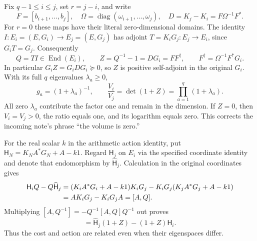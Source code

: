 \documentclass[11pt]{article}
\begin{document}
Fix $q-1\le i\le j$, set $r=j-i$, and write
\begin{equation}
 F=[b_{i+1},\ldots,b_j],\quad
 \Omega=\operatorname{diag}(\omega_{i+1},\ldots,\omega_j),\quad
 D=K_j-K_i=F\Omega^{-1}F^*.\tag{RM.2}
\end{equation}
For $r=0$ these maps have their literal zero-dimensional domains.
The identity $I:E_i=(E,G_i)\to E_j=(E,G_j)$ has adjoint
$T=K_iG_j:E_j\to E_i$, since $G_iT=G_j$. Consequently
\begin{equation}
 Q=TI\in\operatorname{End}(E_i),\qquad
 Z=Q^{-1}-1=DG_i=FF^\dagger,\qquad F^\dagger=\Omega^{-1}F^*G_i.
 \tag{RM.3}
\end{equation}
In particular $G_iZ=G_iDG_i\succeq0$, so $Z$ is positive self-adjoint
in the original $G_i$. With its full $q$ eigenvalues $\lambda_a\ge0$,
\begin{equation}
 g_a=(1+\lambda_a)^{-1},\qquad
 \frac{V_i}{V_j}=\det(1+Z)=\prod_{a=1}^q(1+\lambda_a).
 \tag{RM.4}
\end{equation}
All zero $\lambda_a$ contribute the factor one and remain in the dimension.
If $Z=0$, then $V_i=V_j>0$, the ratio equals one, and its logarithm equals
zero. This corrects the incoming note's phrase ``the volume is zero.''

For the real scalar $k$ in the arithmetic action identity, put
$\mathsf H_N=K_NA^*G_N+A-k1$. Regard $\mathsf H_j$ on $E_i$ via the
specified coordinate identity and denote that endomorphism by
$\widehat{\mathsf H}_j$. Calculation in the original coordinates gives
\begin{align}
 \mathsf H_iQ-Q\widehat{\mathsf H}_j
 &=(K_iA^*G_i+A-k1)K_iG_j
   -K_iG_j(K_jA^*G_j+A-k1)\notag\\
 &=AK_iG_j-K_iG_jA=[A,Q].\notag
\end{align}
Multiplying $[A,Q^{-1}]=-Q^{-1}[A,Q]Q^{-1}$ out proves
\begin{equation}
 [A,Z]=\widehat{\mathsf H}_j(1+Z)-(1+Z)\mathsf H_i.\tag{RM.5}
\end{equation}
Thus the cost and action are related even when their eigenspaces differ.
\end{document}
